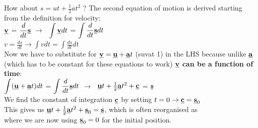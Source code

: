 \begin{frame}{ How about $s = ut + \frac{1}{2}at^2$ ?}
\small
The second equation of motion is derived starting from the definition for velocity:\\[1ex]

\textcolor{blue}{$\displaystyle \underline{\mathbf{v}} $} = \textcolor{red}{$\displaystyle \frac{d}{dt}\underline{\mathbf{s}}$} $\rightarrow \;$  \textcolor{blue}{$\displaystyle \int \underline{\mathbf{v}} dt$} = \textcolor{red}{$ \displaystyle \int \frac{d}{dt}\underline{\mathbf{s}} dt$} \\[1ex]
$ v = \frac{ds}{dt} \rightarrow  \displaystyle \int v dt  = \displaystyle \int \frac{ds}{dt} dt$\\[1ex]
Now we have to substitute for $\underline{\mathbf{v}} = \underline{\mathbf{u}}+\underline{\mathbf{a}}t$ (suvat 1) in the LHS because unlike $\underline{\mathbf{a}}$ (which has to be constant for these equations to work) $\underline{\mathbf{v}}$ \textbf{can be a function of time}:\\[1ex]

 \textcolor{blue}{$\displaystyle \int (\underline{\mathbf{u}} + \underline{\mathbf{a}}t) dt$} = \textcolor{red}{$ \displaystyle \int \frac{d}{dt} \underline{\mathbf{s}} dt$} $\rightarrow \;$  \textcolor{blue}{$\underline{\mathbf{u}}t + \frac{1}{2}\underline{\mathbf{a}}t^2 + \underline{\mathbf{c}}$} = \textcolor{red}{$\underline{\mathbf{s}}$} \\[1ex]


We find the constant of integration $\underline{\mathbf{c}}$ by setting $t = 0 \rightarrow \underline{\mathbf{c}} = \underline{\mathbf{s}}_0 $\\[1ex]

This gives us $\underline{\mathbf{u}}t + \frac{1}{2}\underline{\mathbf{a}}t^2 + \underline{\mathbf{s}}_0 = \underline{\mathbf{s}}$, which is often reorganised as \\[1ex]
where we are now using $\underline{\mathbf{s}}_0 =0$ for the initial position.\\[1ex]

\\[1ex]
\end{frame}


